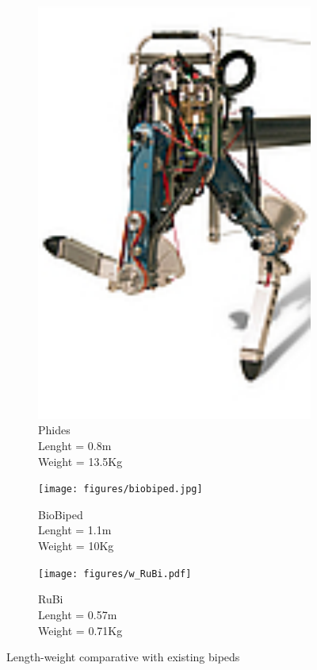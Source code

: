 \begin{figure}[h]
\begin{subfigure}{.22\textwidth}
    \includegraphics[width=0.9\linewidth]{figures/w_phides.pdf}
    \caption{Phides\\
    Lenght = 0.8m\\
    Weight = 13.5Kg}
    \label{fig:w_phides}
  \end{subfigure}
  \begin{subfigure}{.22\textwidth}
    \texttt{[image: figures/biobiped.jpg]}
    \caption{BioBiped\\
    Lenght = 1.1m\\
    Weight = 10Kg}
    \label{fig:w_biobiped}
  \end{subfigure}
  \begin{subfigure}{.22\textwidth}
    \texttt{[image: figures/w\_RuBi.pdf]}
    \caption{RuBi\\
    Lenght = 0.57m\\
    Weight = 0.71Kg}
    \label{fig:w_rubi}
  \end{subfigure}
  \caption{Length-weight comparative with existing bipeds}
  \label{fig:bipedal_robots}
\end{figure}  


